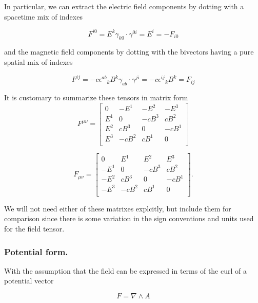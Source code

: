 \documentclass{article}
\newcommand{\grad}[0]{\nabla}
\begin{document}
In particular, we can extract the electric field components by dotting with a spacetime mix of indexes

\begin{equation*}
F^{i0} = E^k \gamma_{k0} \cdot \gamma^{0i} = E^i = -F_{i0}
\end{equation*}

and the magnetic field components by dotting with the bivectors having a pure spatial mix of indexes

\begin{equation*}
F^{ij} = - c {\epsilon^{a b}}_k B^k \gamma_{a b} \cdot \gamma^{ji} = - c {\epsilon^{i j}}_k B^k = F_{ij}
\end{equation*}

It is customary to summarize these tensors in matrix form
\begin{equation}\label{eqn:matrixtensor}
F^{\mu\nu} =
\begin{bmatrix}
0   & -E^1 & -E^2 & -E^3 \\
E^1 &   0  & -c B^3 &  c B^2 \\
E^2 &  c B^3 &   0  & -c B^1 \\
E^3 & -c B^2 &  c B^1 &   0  \\
\end{bmatrix}
\end{equation}

\begin{equation}
F_{\mu\nu} =
\begin{bmatrix}
0   & E^1 & E^2 & E^3 \\
-E^1 &   0  & -c B^3 &  c B^2 \\
-E^2 &  c B^3 &   0  & -c B^1 \\
-E^3 & -c B^2 &  c B^1 &   0  \\
\end{bmatrix}.
\end{equation}

We will not need either of these matrixes explcitly, but include them for comparison since there is some variation in the sign conventions and units used
for the field tensor.

\subsubsection{ Potential form. }

With the assumption that the field can be expressed in terms of the curl of a potential vector

\begin{equation}\label{eqn:potentialdef}
F = \grad \wedge A
\end{equation}
\end{document}
